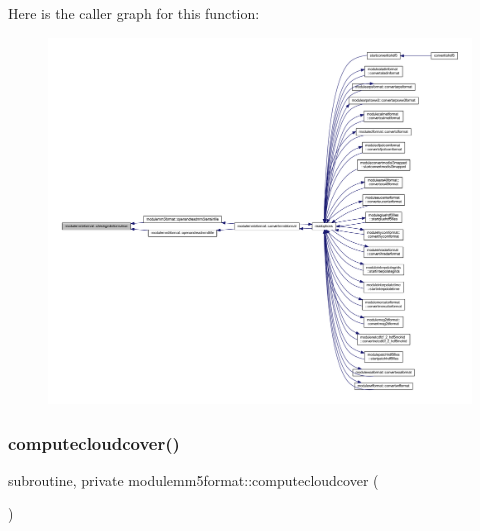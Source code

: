 Here is the caller graph for this function\+:\nopagebreak
\begin{figure}[H]
\begin{center}
\leavevmode
\includegraphics[width=350pt]{namespacemodulemm5format_af3c3e0015f7df36b0498d741f6d745c3_icgraph}
\end{center}
\end{figure}
\mbox{\label{namespacemodulemm5format_af9b804a0c8c480ae7a682237c8d37831}} 
\subsubsection{\texorpdfstring{computecloudcover()}{computecloudcover()}}
{\footnotesize\ttfamily subroutine, private modulemm5format\+::computecloudcover (\begin{DoxyParamCaption}{ }\end{DoxyParamCaption})\hspace{0.3cm}{\ttfamily [private]}}

